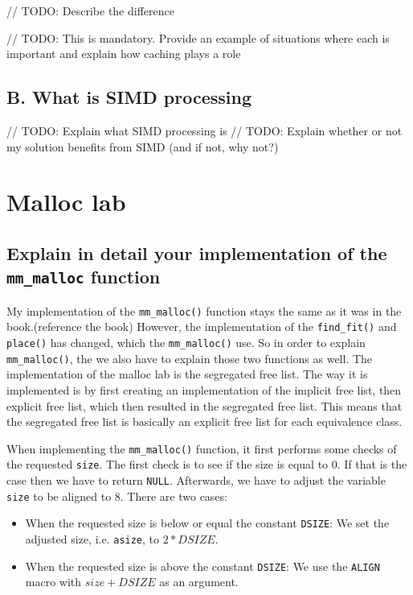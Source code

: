 \documentclass[11pt]{article}
\newcommand{\code}[1]{{\colorbox{lightgray!15}{\color{orange}\texttt{#1}}}}
\newcommand{\temp}[1]{{\color{red}#1}}
\begin{document}
// TODO: Describe the difference

// TODO: This is mandatory. Provide an example of situations where each is important and explain how caching plays a role

\subsection{B. What is SIMD processing}

// TODO: Explain what SIMD processing is
// TODO: Explain whether or not my solution benefits from SIMD (and if not, why not?)
\section{Malloc lab}
\subsection{Explain in detail your implementation of the \code{mm\_malloc} function}

My implementation of the \code{mm\_malloc()} function stays the same as it was in the book.\temp{(reference the book)}
However, the implementation of the \code{find\_fit()} and \code{place()} has changed, which the \code{mm\_malloc()} use. So in order to explain \code{mm\_malloc()},
the we also have to explain those two functions as well.
The implementation of the malloc lab is the segregated free list. 
The way it is implemented is by first creating an implementation of the implicit free list, then explicit free list, 
which then resulted in the segregated free list.
This means that the segregated free list is basically an explicit free list for each equivalence class.

When implementing the \code{mm\_malloc()} function, it first performs some checks of the requested \code{size}. The first check is to see if the size is equal to 0. If that is the case then we have to return \code{NULL}.
Afterwards, we have to adjust the variable \code{size} to be aligned to 8. There are two cases:
\begin{itemize}
    \item When the requested size is below or equal the constant \code{DSIZE}: We set the adjusted size, i.e. \code{asize}, to $2 * DSIZE$.
    \item When the requested size is above the constant \code{DSIZE}: We use the \code{ALIGN} macro with $size + DSIZE$ as an argument.
\end{itemize}
\end{document}
